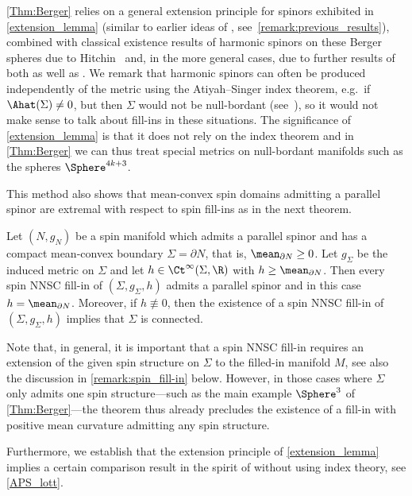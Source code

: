 \documentclass[a4paper,11pt]{amsart}
\numberwithin{equation}{section}
\begin{document}
\cref{Thm:Berger} relies on a general extension principle for spinors exhibited in \cref{extension_lemma} (similar to earlier ideas of \textcite{Raulot:RigidityCompact,Hijazi_etal}, see~\cref{remark:previous_results}), combined with classical existence results of harmonic spinors on these Berger spheres due to Hitchin~\cite{Hitchin} and, in the more general cases, due to further results of both \textcite{Hitchin} as well as \textcite{Baer_Harmonic_spinors}.
We remark that harmonic spinors can often be produced independently of the metric using the Atiyah--Singer index theorem, e.g.\ if \(\Ahat({\Sigma}) \neq 0\), but then \(\Sigma\) would not be null-bordant (see~\cite[Chapter III, \S 11, (11.21)]{LawsonMichelsohn}), so it would not make sense to talk about fill-ins in these situations.
The significance of \cref{extension_lemma} is that it does not rely on the index theorem and in \cref{Thm:Berger} we can thus treat special metrics on null-bordant manifolds such as the spheres \(\Sphere^{4k+3}\).

This method also shows that mean-convex spin domains admitting a parallel spinor are extremal with respect to spin fill-ins as in the next theorem.

\begin{theorem}\label{Thm:ricci_flat_extremality}
    Let \((N,g_N)\) be a spin manifold which admits a parallel spinor and has a compact mean-convex boundary \(\Sigma = \partial N\), that is, \(\mean_{\partial N} \geq 0\).
    Let \(g_\Sigma\) be the induced metric on \(\Sigma\) and let \(h \in \Ct^\infty(\Sigma, \R)\) with \(h \geq \mean_{\partial N}\).
    Then every spin NNSC fill-in of \((\Sigma, g_{\Sigma}, h)\) admits a parallel spinor and in this case \(h = \mean_{\partial N}\).
    Moreover, if \(h \not\equiv 0\), then the existence of a spin NNSC fill-in of \((\Sigma, g_{\Sigma}, h)\) implies that \(\Sigma\) is connected.
\end{theorem}

Note that, in general, it is important that a spin NNSC fill-in requires an extension of the given spin structure on \(\Sigma\) to the filled-in manifold \(M\), see also the discussion in \cref{remark:spin_fill-in} below.
However, in those cases where \(\Sigma\) only admits one spin structure---such as the main example \(\Sphere^3\) of \cref{Thm:Berger}---the theorem thus already precludes the existence of a fill-in with positive mean curvature admitting any spin structure.

Furthermore, we establish that the extension principle of \cref{extension_lemma} implies a certain comparison result in the spirit of \textcite{GoetteSemmelmann,Lott} without using index theory, see \cref{APS_lott}.
\end{document}
